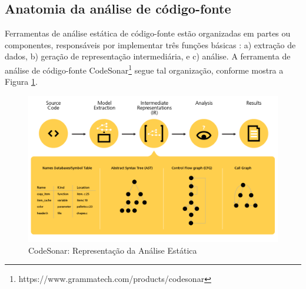\subsection{Anatomia da análise de código-fonte} \label{anatomia}

Ferramentas de análise estática de código-fonte estão organizadas em partes ou
componentes, responsáveis por implementar três funções básicas \cite{Cruz2009}
\cite{Binkley2007}: a) extração de dados, b) geração de representação
intermediária, e c) análise. A ferramenta de análise de código-fonte
CodeSonar\footnote{https://www.grammatech.com/products/codesonar} segue tal
organização, conforme mostra a Figura \ref{static-analysis-representation}.

\begin{figure}[h]
  \center
  \includegraphics[scale=0.4]{imagens/static-analysis-representation.png}
  \caption{CodeSonar: Representação da Análise Estática \cite{GrammaTech2016}}
  \label{static-analysis-representation}
\end{figure}

